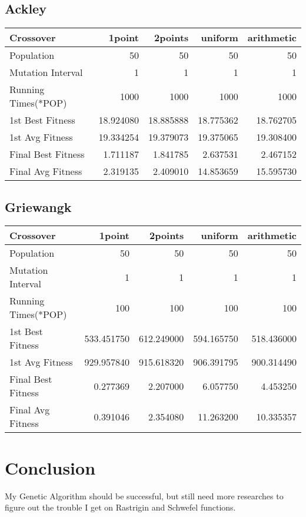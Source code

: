 \documentclass[12pt]{article}
\begin{document}
\subsection{Ackley}
\begin{center}
	\begin{tabular}{| l | r | r | r | r | }
	\hline
	\bf Crossover & \bf 1point & \bf 2points & \bf uniform & \bf  arithmetic \\
	\hline
	Population & 50 & 50 & 50 & 50\\
	Mutation Interval & 1 & 1 & 1 & 1\\
	Running Times(*POP) & 1000 & 1000 & 1000 & 1000 \\
	1st Best Fitness & 18.924080 & 18.885888 & 18.775362 & 18.762705 \\
	1st Avg Fitness & 19.334254 & 19.379073 & 19.375065 & 19.308400\\
	Final Best Fitness & 1.711187 & 1.841785 & 2.637531 & 2.467152\\
	Final Avg Fitness & 2.319135 & 2.409010 & 14.853659 & 15.595730 \\
	\hline
	\end{tabular}
	\end{center}
	
\subsection{Griewangk}
\begin{center}
	\begin{tabular}{| l | r | r | r | r | }
	\hline
	\bf Crossover & \bf 1point & \bf 2points & \bf uniform & \bf  arithmetic \\
	\hline
	Population & 50 & 50 & 50 & 50\\
	Mutation Interval & 1 & 1 & 1 & 1 \\
	Running Times(*POP) & 100 & 100 & 100 & 100 \\
	1st Best Fitness & 533.451750 & 612.249000 & 594.165750 & 518.436000 \\
	1st Avg Fitness & 929.957840 & 915.618320 & 906.391795 & 900.314490 \\
	Final Best Fitness & 0.277369 & 2.207000  & 6.057750 & 4.453250 \\
	Final Avg Fitness & 0.391046 & 2.354080 & 11.263200 & 10.335357\\
	\hline
	\end{tabular}
	\end{center}
	
\section{Conclusion}
My Genetic Algorithm should be successful, but still need more researches to figure out the trouble I get on Rastrigin and Schwefel functions.
\end{document}
